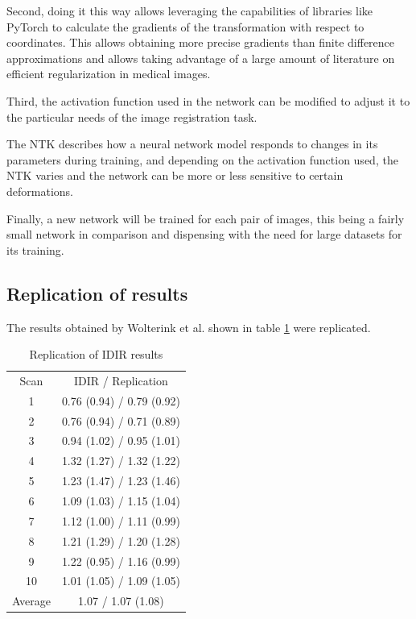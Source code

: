 Second, doing it this way allows leveraging the capabilities of libraries like PyTorch to calculate the gradients of the transformation with respect to coordinates.
This allows obtaining more precise gradients than finite difference approximations
and allows taking advantage of a large amount of literature on efficient regularization in medical images.

Third, the activation function used in the network can be modified to adjust it to the particular needs of the image registration task.

The \gls{NTK} describes how a neural network model responds to changes in its parameters during training,
and depending on the activation function used, the NTK varies and the network can be more or less sensitive to certain deformations.

Finally, a new network will be trained for each pair of images, this being a fairly small network in comparison and dispensing with the need for large datasets for its training.

\subsection{Replication of results}
\label{subsec:Replication of results}

The results obtained by Wolterink et al. \cite{wolterink2021implicit} shown in table \ref{tab:comparison} were replicated.

\begin{table}[ht]
    \centering
    \caption{Replication of IDIR results}
    \begin{tabular}{c|c}
        Scan & {IDIR / Replication} \\
        1  & 0.76 (0.94) / 0.79 (0.92) \\
        2  & 0.76 (0.94) / 0.71 (0.89) \\
        3  & 0.94 (1.02) / 0.95 (1.01) \\
        4  & 1.32 (1.27) / 1.32 (1.22) \\
        5  & 1.23 (1.47) / 1.23 (1.46) \\
        6  & 1.09 (1.03) / 1.15 (1.04) \\
        7  & 1.12 (1.00) / 1.11 (0.99) \\
        8  & 1.21 (1.29) / 1.20 (1.28) \\
        9  & 1.22 (0.95) / 1.16 (0.99) \\
        10 & 1.01 (1.05) / 1.09 (1.05) \\
        Average & 1.07 / 1.07 (1.08) \\
    \end{tabular}
    \label{tab:comparison}
\end{table}

